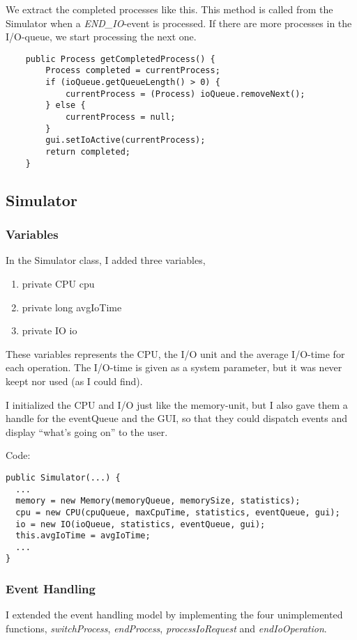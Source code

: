 \documentclass[norsk,a4paper]{article}
\begin{document}
We extract the completed processes like this. This method is called from the
Simulator when a \emph{END\_IO}-event is processed. If there are more processes
in the I/O-queue, we start processing the next one.
\begin{lstlisting}
    public Process getCompletedProcess() {
        Process completed = currentProcess;
        if (ioQueue.getQueueLength() > 0) {
            currentProcess = (Process) ioQueue.removeNext();
        } else {
            currentProcess = null;
        }
        gui.setIoActive(currentProcess);
        return completed;
    }
\end{lstlisting}

\subsection{Simulator}
\subsubsection{Variables}
In the Simulator class, I added three variables,
\begin{enumerate}
     \item private CPU cpu 
     \item private long avgIoTime 
     \item private IO io 
\end{enumerate}

These variables represents the CPU, the I/O unit and the average I/O-time for
each operation. The I/O-time is given as a system parameter, but it was never
keept nor used (as I could find).

I initialized the CPU and I/O just like the memory-unit, but I also gave them a
handle for the eventQueue and the GUI, so that they could dispatch events and
display ``what's going on'' to the user.

Code:
\begin{lstlisting}
public Simulator(...) {
  ...
  memory = new Memory(memoryQueue, memorySize, statistics);
  cpu = new CPU(cpuQueue, maxCpuTime, statistics, eventQueue, gui);
  io = new IO(ioQueue, statistics, eventQueue, gui);
  this.avgIoTime = avgIoTime;
  ...
}
\end{lstlisting}

\subsubsection{Event Handling}
I extended the event handling model by implementing the four unimplemented
functions, \emph{switchProcess}, \emph{endProcess}, \emph{processIoRequest} and
\emph{endIoOperation}.
\end{document}
